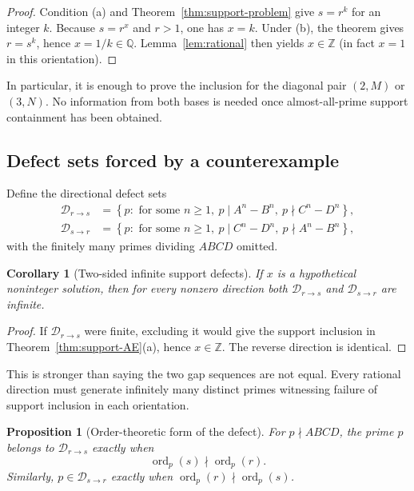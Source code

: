 \documentclass[11pt,oneside]{article}
\newtheorem{proposition}[theorem]{Proposition}
\newtheorem{corollary}[theorem]{Corollary}
\theoremstyle{definition}
\theoremstyle{remark}
\newcommand{\Z}{\mathbb Z}
\newcommand{\Q}{\mathbb Q}
\newcommand{\ord}{\operatorname{ord}}
\begin{document}
\begin{proof}
Condition (a) and Theorem~\ref{thm:support-problem} give $s=r^k$ for an integer $k$.
Because $s=r^x$ and $r>1$, one has $x=k$.  Under (b), the theorem gives $r=s^k$, hence
$x=1/k\in\Q$.  Lemma~\ref{lem:rational} then yields $x\in\Z$ (in fact $x=1$ in this
orientation).
\end{proof}

In particular, it is enough to prove the inclusion for the diagonal pair $(2,M)$ or
$(3,N)$.  No information from both bases is needed once almost-all-prime support containment
has been obtained.

\subsection{Defect sets forced by a counterexample}

Define the directional defect sets
\begin{align*}
 \mathcal D_{r\to s}
 &=\left\{p:\text{ for some }n\ge1,
          \ p\mid A^n-B^n,\ p\nmid C^n-D^n\right\},\\
 \mathcal D_{s\to r}
 &=\left\{p:\text{ for some }n\ge1,
          \ p\mid C^n-D^n,\ p\nmid A^n-B^n\right\},
\end{align*}
with the finitely many primes dividing $ABCD$ omitted.

\begin{corollary}[Two-sided infinite support defects]
\label{cor:defect-infinite}
If $x$ is a hypothetical noninteger solution, then for every nonzero direction both
$\mathcal D_{r\to s}$ and $\mathcal D_{s\to r}$ are infinite.
\end{corollary}

\begin{proof}
If $\mathcal D_{r\to s}$ were finite, excluding it would give the support inclusion in
Theorem~\ref{thm:support-AE}(a), hence $x\in\Z$.  The reverse direction is identical.
\end{proof}

This is stronger than saying the two gap sequences are not equal.  Every rational direction
must generate infinitely many distinct primes witnessing failure of support inclusion in
each orientation.

\begin{proposition}[Order-theoretic form of the defect]
\label{prop:order-defect}
For $p\nmid ABCD$, the prime $p$ belongs to $\mathcal D_{r\to s}$ exactly when
\[
 \ord_p(s)\nmid \ord_p(r).
\]
Similarly, $p\in\mathcal D_{s\to r}$ exactly when
$\ord_p(r)\nmid\ord_p(s)$.
\end{proposition}
\end{document}
